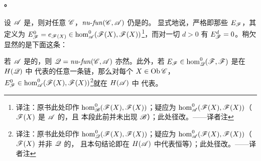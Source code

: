 \paragraph{\trFunctor\trCategory。}\label{sub:functor-categories}
设 $\mathscr{A}$ 是\trStrictlyUnital{}\trACategory，则对任意\trNonunital{}\trACategory{}%
$\mathscr{C}$，$\mathit{nu}\text{-}\mathit{fun}(\mathscr{C},\mathscr{A})$ 仍是\trStrictlyUnital{}的。
显式地说，严格\trIdentityMorphism{}即那些\trNaturalTransformation{} $E_{\mathscr{F}}$，其
定义为 $E^0_{\mathscr{F}}=e_{\mathscr{F}(X)}
\in\hom^0_{\mathscr{A}}(\mathscr{F}(X),\mathscr{F}(X))$\footnote{译注：原书此处印作
$\hom^0_{\mathscr{B}}(\mathscr{F}(X),\mathscr{F}(X))$；疑应为
$\hom^0_{\mathscr{A}}(\mathscr{F}(X),\mathscr{F}(X))$（$\mathscr{F}(X)$ 是 $\mathscr{A}$ 的\trObject，且
本段此前并未出现 $\mathscr{B}$）；此处径改。——译者注}，而对一切 $d>0$ 有
$E^d_{\mathscr{F}}=0$。稍欠显然的是下面这条：
\begin{lemma}\label{thm:functor-category-cunital}
若 $\mathscr{A}$ 是\trCunital{}的，则 $\mathscr{Q}=\mathit{nu}\text{-}\mathit{fun}(\mathscr{C},\mathscr{A})$
亦然。此外，若 $E_{\mathscr{F}}\in\hom^0_{\mathscr{Q}}(\mathscr{F},\mathscr{F})$ 是在 $H(\mathscr{Q})$ 中
代表\trIdentityMorphism{}的任意一条链，那么对每个 $X\in\operatorname{Ob}\mathscr{C}$，
$E^0_{\mathscr{F}}\in\hom^0_{\mathscr{A}}(\mathscr{F}(X),\mathscr{F}(X))$\footnote{译注：原书此处印作
$\hom^0_{\mathscr{Q}}(\mathscr{F}(X),\mathscr{F}(X))$；疑应为
$\hom^0_{\mathscr{A}}(\mathscr{F}(X),\mathscr{F}(X))$（$\mathscr{F}(X)$ 并非 $\mathscr{Q}$ 的\trObject，
且本句结论即在 $H(\mathscr{A})$ 中代表恒等）；此处径改。——译者注}就在 $H(\mathscr{A})$ 中
代表\trIdentityMorphism。
\end{lemma}
